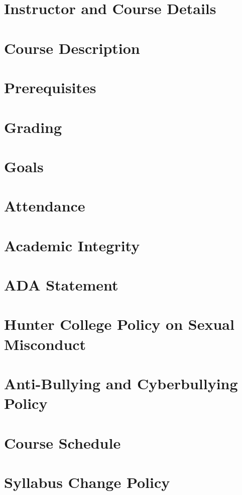 \documentclass[11pt]{article} %
\title{\coursenumber\\\coursetitle}
\author{}
\date{\semester}
\begin{document}
\pagestyle{fancy} 
\fancyhead{}
\lhead{\coursenumber} %
\rhead{\semester} %

\maketitle

\thispagestyle{fancy}

\section*{Instructor and Course Details}

\section*{Course Description}

\section*{Prerequisites}

\section*{Grading}

\section*{Goals}

\section*{Attendance}

\section*{Academic Integrity}

\section*{ADA Statement}

\section*{Hunter College Policy on Sexual Misconduct}

\section*{Anti-Bullying and Cyberbullying Policy}

\section*{Course Schedule}

\section*{Syllabus Change Policy}

\end{document}
